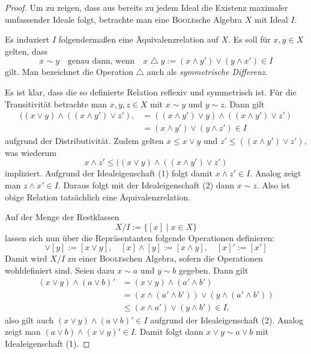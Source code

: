\begin{proof}
  
  Um zu zeigen, dass aus \PIT bereits zu jedem Ideal die Existenz maximaler umfassender Ideale folgt, betrachte man eine \textsc{Boole}sche Algebra $X$ mit Ideal $I$.
  
  Es induziert $I$ folgendermaßen eine Äquivalenzrelation auf $X$.
  Es soll für $x,y \in X$ gelten, dass 
  \begin{displaymath}
    x \sim y \quad \text{genau dann, wenn} \quad x \bigtriangleup y := (x \land y') \lor (y \land x') \in I
  \end{displaymath}
  gilt.
  Man bezeichnet die Operation $\bigtriangleup$ auch als \textit{symmetrische Differenz}.

  Es ist klar, dass die so definierte Relation reflexiv und symmetrisch ist.
  Für die Transitivität betrachte man $x,y,z \in X$ mit $x \sim y$ und $y \sim z$.
  Dann gilt
  \begin{align*}
    ((x  \lor y  ) \land ((x \land y') \lor z' ),
    &=  ((x \land y') \lor y  ) \land ((x \land y') \lor z' ) \\
    &= (x \land y') \lor (y \land z') \in I
  \end{align*}
  aufgrund der Distributivität.
  Zudem gelten $x \leq x \lor y$ und $z' \leq ((x \land y') \lor z')$, was wiederum
  \begin{displaymath}
    x \land z' \leq  ((x  \lor y  ) \land ((x \land y') \lor z' )
  \end{displaymath}
  impliziert.
  Aufgrund der Idealeigenschaft (1) folgt damit $x \land z' \in I$.
  Analog zeigt man $z \land x' \in I$.
  Daraus folgt mit der Idealeigenschaft (2) dann $x \sim z$.
  Also ist obige Relation tatsächlich eine Äquivalenzrelation.

  Auf der Menge der Restklassen 
  \begin{displaymath}
    X / I := \{[x] \mid x \in X\}
  \end{displaymath}
  lassen sich nun über die Repräsentanten folgende Operationen definieren:
  \begin{displaymath}
    [x] \lor [y] := [x \lor y], \quad
    [x] \land [y] := [x \land y], \quad
    [x]' := [x']
  \end{displaymath}
  Damit wird $X/I$ zu einer \textsc{Boole}schen Algebra, sofern die Operationen wohldefiniert sind.
  Seien dazu $x \sim a$ und $y \sim b$ gegeben.
  Dann gilt
  \begin{align*}
    (x \lor y) \land (a \lor b)'
    &= (x \lor y) \land (a' \land b') \\
    &= (x \land (a' \land b')) \lor (y \land (a' \land b')) \\
    &\leq (x \land a') \lor (y \land b')  \in I,
  \end{align*}
  also gilt auch $(x \lor y) \land (a \lor b)' \in I$ aufgrund der Idealeigenschaft (2).
  Analog zeigt man $ (a \lor b) \land (x \lor y)' \in I$.
  Damit folgt dann $x \lor y \sim a \lor b$ mit Idealeigenschaft (1).


\end{proof}
